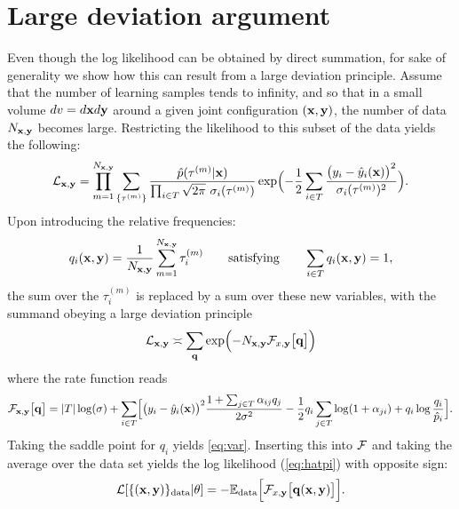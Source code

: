 \section{Large deviation argument}
Even though the log likelihood can be obtained by direct summation, for sake of 
generality we show how this can result from a large deviation principle.
Assume that the number of learning samples tends to infinity, and so that in a 
small volume $dv = d\mathbf{x} d{\bf y}$ around a given joint configuration 
$(\mathbf{x},{\bf y})$, the number of data $N_{\mathbf{x},{\bf y}}$ becomes large. 
Restricting the likelihood to this subset of the data yields the following:
\[
{\cal L}_{\mathbf{x},{\bf y}} = \prod_{m=1}^{N_{\mathbf{x},{\bf y}}} \sum_{\{\tau^{(m)}\}} 
\frac{\hat p(\tau^{(m)}\vert \mathbf{x})}{\prod_{i\in  T}\sqrt{2\pi}\ \sigma_i(\tau^{(m)})}
\exp\Bigl(-\frac{1}{2}\sum_{i\in  T}\frac{\bigl(y_i-\hat y_i(\mathbf{x})\bigr)^2}{\sigma_i(\tau^{(m)})^2}\Bigr).
\]
Upon introducing the relative frequencies:
\[
q_i(\mathbf{x},{\bf y}) = \frac{1}{N_{\mathbf{x},{\bf y}}}\sum_{m=1}^{N_{\mathbf{x},{\bf y}}} \tau_i^{(m)} 
\qquad\text{satisfying}\qquad 
\sum_{i\in  T} q_i(\mathbf{x},{\bf y}) = 1,
\]
the sum over the $\tau_i^{(m)}$ is replaced by a sum over these new variables, 
with the summand obeying a large deviation principle 
\[
{\cal L}_{\mathbf{x},{\bf y}} \asymp \sum_{{\bf q}} 
\exp\Bigl(-N_{\mathbf{x},{\bf y}} {\cal F}_{x,{\bf y}}\bigl[{\bf q}\bigr]\Bigr)
\]
where the rate function reads
\[
{\cal F}_{\mathbf{x},{\bf y}}\bigl[{\bf q}\bigr] = \vert T\vert\log(\sigma)+
\sum_{i\in  T}\Bigl[\bigl(y_i-\hat y_i(\mathbf{x})\bigr)^2\frac{1+\sum_{j\in  T}\alpha_{ij}q_j}{2\sigma^2}
-\frac{1}{2}q_i\sum_{j\in  T}\log(1+\alpha_{ji})+q_i\log\frac{q_i}{\hat p_i}\Bigr].
\]
Taking the saddle point for $q_i$ yields %
\cref{eq:var}. Inserting this into ${\cal F}$ and taking
the average over the data set yields the log likelihood (\cref{eq:hatpi}) with 
opposite sign:
\[
{\cal L}[\{(\mathbf{x},{\bf y})\}_{\rm data}\vert\theta]
 = -{\mathbb E}_{\rm data}\Bigl[{\cal F}_{x,{\bf y}}\bigl[{\bf q}(\mathbf{x},{\bf y})\bigr]\Bigr].
\]

